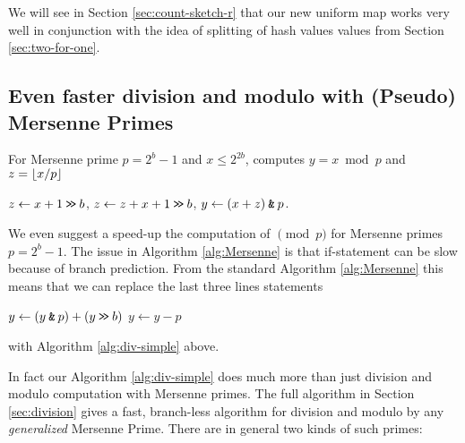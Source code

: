 We will see in Section \ref{sec:count-sketch-r} that our new uniform map
works very well in conjunction with the idea of splitting of hash values 
values from Section \ref{sec:two-for-one}.




\subsection{Even faster division and modulo with (Pseudo) Mersenne Primes}
%
\begin{algorithm}\label{alg:div-simple}
   \caption{For Mersenne prime $p=2^b-1$ and $x\leq 2^{2b}$, computes
   $y=x\bmod p$ and $z=\lfloor {x/p} \rfloor$}
   \begin{algorithmic}
      \State $z \gets x+1 \mathbin{\texttt{>\!>}} b$,
      \State $z \gets z+x+1 \mathbin{\texttt{>\!>}} b$,
      \State $y \gets (x + z) \mathbin{\texttt{\&}} p $.
   \end{algorithmic}
\end{algorithm}
%
We even suggest a speed-up the computation of $\pmod p$ for Mersenne primes
$p=2^b-1$. The issue in Algorithm \ref{alg:Mersenne} is that
if-statement can be slow because of branch prediction.
From the standard Algorithm \ref{alg:Mersenne} this means that we can
replace the last three lines statements
\begin{algorithmic}
   \State $y \gets (y\mathbin{\texttt{\&}} p)+(y\mathbin{\texttt{>\!>}} b)$
      \State $y\gets y-p$
   \EndIf
\end{algorithmic}
with Algorithm \ref{alg:div-simple} above.

\vspace{1em}

In fact our Algorithm \ref{alg:div-simple} does much more than just division and modulo computation with Mersenne primes.
The full algorithm in Section \ref{sec:division} gives a fast, branch-less algorithm for division and modulo by any \emph{generalized} Mersenne Prime.
There are in general two kinds of such primes:


